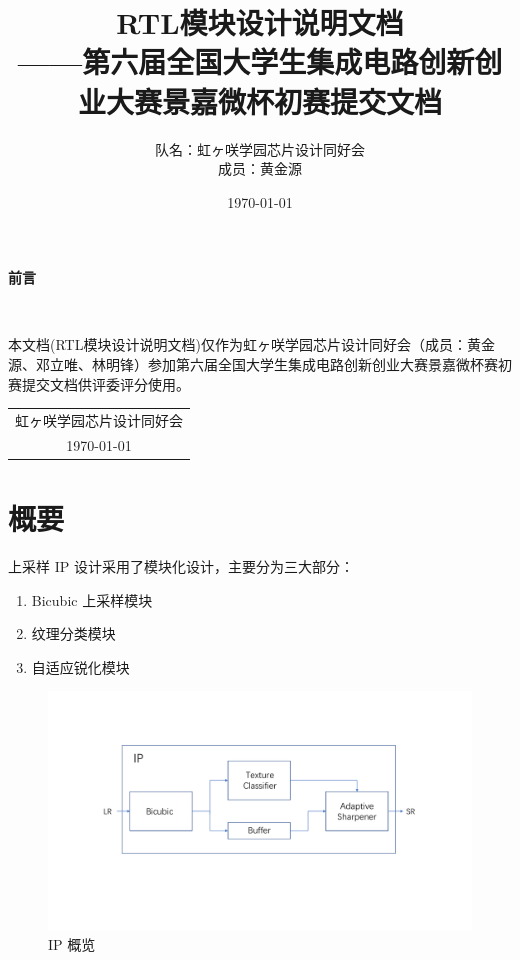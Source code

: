 \documentclass[12pt, a4paper, oneside]{ctexbook}
\title{{\Huge{\textbf{RTL模块设计说明文档}}}\normalsize{\\——第六届全国大学生集成电路创新创业大赛景嘉微杯初赛提交文档}}
\author{队名：虹ヶ咲学园芯片设计同好会\\ 成员：黄金源\space邓立唯\space林明锋}
\date{\today}
\begin{document}
	\maketitle	
	\setcounter{page}{1}
	\begin{center}
		\Huge\textbf{前言}
	\end{center}~\
	
	本文档(RTL模块设计说明文档)仅作为虹ヶ咲学园芯片设计同好会（成员：黄金源、邓立唯、林明锋）参加第六届全国大学生集成电路创新创业大赛景嘉微杯赛初赛提交文档供评委评分使用。
	~\\
	\begin{flushright}
		\begin{tabular}{c}
			虹ヶ咲学园芯片设计同好会\\
			\today
		\end{tabular}
	\end{flushright}
	\newpage
	\setcounter{page}{1}
	\tableofcontents
	\newpage
	\setcounter{page}{1}
	
	\chapter{概要}
	上采样 IP 设计采用了模块化设计，主要分为三大部分：
	\begin{enumerate}
		\item Bicubic 上采样模块
		\item 纹理分类模块
		\item 自适应锐化模块
	\end{enumerate}
	
	\begin{figure}[h]
		\centering
		\includegraphics[scale=0.65]{pic/Overview.pdf}
		\caption{IP 概览}
		\label{fig:ip-overview}
	\end{figure}
	
\end{document}
